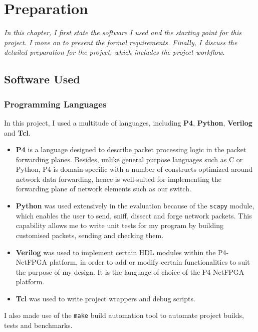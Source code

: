 \chapter{Preparation}
\textit{In this chapter, I first state the software I used and the starting point for this project. I move on to present the formal requirements. Finally, I discuss the detailed preparation for the project, which includes the project workflow. 
}

\section{Software Used}
	\subsection{Programming Languages}
	In this project, I used a multitude of languages, including \textbf{P4}, \textbf{Python}, \textbf{Verilog} and \textbf{Tcl}.
	
	\begin{itemize}
		\item \textbf{P4} is a language designed to describe packet processing logic in the packet forwarding planes. Besides, unlike general purpose languages such as C or Python, P4 is domain-specific with a number of constructs optimized around network data forwarding, hence is well-suited for implementing the forwarding plane of network elements such as our switch.
	
		\item \textbf{Python} was used extensively in the evaluation because of the \texttt{scapy} module, which enables the user to send, sniff, dissect and forge network packets. This capability allows me to write unit tests for my program by building customised packets, sending and checking them.
		
		\item \textbf{Verilog} was used to implement certain HDL modules within the P4-NetFPGA platform, in order to add or modify certain functionalities to suit the purpose of my design. It is the language of choice of the P4-NetFPGA platform.
		
		\item \textbf{Tcl} was used to write project wrappers and debug scripts.
	\end{itemize}

	I also made use of the \texttt{make} build automation tool to automate project builds, tests and benchmarks.
	
